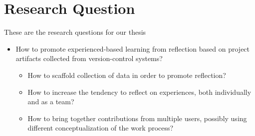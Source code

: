 \section{Research Question}
These are the research questions for our thesis
\begin{itemize}
	\item How to promote experienced-based learning from reflection based on project artifacts collected from version-control systems?
	\begin{itemize}
		\item How to scaffold collection of data in order to promote reflection?
		\item How to increase the tendency to reflect on experiences, both individually and as a team? 
		\item How to bring together contributions from multiple users, possibly using different conceptualization of the work process? 
	\end{itemize}
\end{itemize}